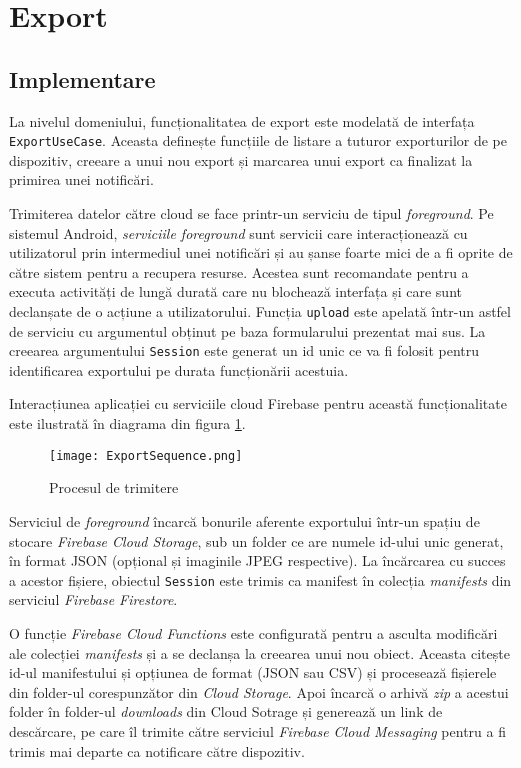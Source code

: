 \section{Export}

\subsection{Implementare}

La nivelul domeniului, funcționalitatea de export este modelată de interfața \texttt{ExportUseCase}. Aceasta definește funcțiile de listare a tuturor exporturilor de pe dispozitiv, creeare a unui nou export și marcarea unui export ca finalizat la primirea unei notificări.



Trimiterea datelor către cloud se face printr-un serviciu de tipul \emph{foreground}. Pe sistemul Android, \emph{serviciile foreground} sunt servicii care interacționează cu utilizatorul prin intermediul unei notificări și au șanse foarte mici de a fi oprite de către sistem pentru a recupera resurse. Acestea sunt recomandate pentru a executa activități de lungă durată care nu blochează interfața și care sunt declanșate de o acțiune a utilizatorului. Funcția \texttt{upload} este apelată într-un astfel de serviciu cu argumentul obținut pe baza formularului prezentat mai sus. La creearea argumentului \texttt{Session} este generat un id unic ce va fi folosit pentru identificarea exportului pe durata funcționării acestuia.

Interacțiunea aplicației cu serviciile cloud Firebase pentru această funcționalitate este ilustrată în diagrama din figura \ref{exportProcess}.

\begin{figure}[ht]
  \centering
  \texttt{[image: ExportSequence.png]}
  \caption{Procesul de trimitere}
  \label{exportProcess}
\end{figure}

Serviciul de \emph{foreground} încarcă bonurile aferente exportului într-un spațiu de stocare \emph{Firebase Cloud Storage}, sub un folder ce are numele id-ului unic generat, în format JSON (opțional și imaginile JPEG respective). La încărcarea cu succes a acestor fișiere, obiectul \texttt{Session} este trimis ca manifest în colecția \emph{manifests} din serviciul \emph{Firebase Firestore}.

O funcție \emph{Firebase Cloud Functions} este configurată pentru a asculta modificări ale colecției \emph{manifests} și a se declanșa la creearea unui nou obiect. Aceasta citește id-ul manifestului și opțiunea de format (JSON sau CSV) și procesează fișierele din folder-ul corespunzător din \emph{Cloud Storage}. Apoi încarcă o arhivă \emph{zip} a acestui folder în folder-ul \emph{downloads} din Cloud Sotrage și generează un link de descărcare, pe care îl trimite către serviciul \emph{Firebase Cloud Messaging} pentru a fi trimis mai departe ca notificare către dispozitiv.

